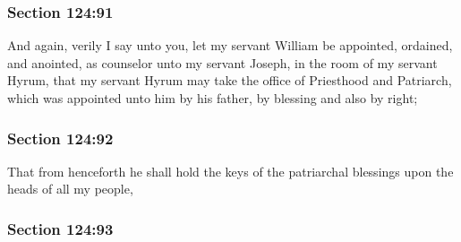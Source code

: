 
	\subsubsection{Section 124:91} %
		\label{DC124-91}

		And again, verily I say unto you, let my servant William be appointed, ordained, and anointed, as counselor unto my servant Joseph, in the room of my servant Hyrum, that my servant Hyrum may take the office of Priesthood and Patriarch, which was appointed unto him by his father, by blessing and also by right;


	\subsubsection{Section 124:92} %
		\label{DC124-92}

		That from henceforth he shall hold the keys of the patriarchal blessings upon the heads of all my people,


	\subsubsection{Section 124:93} %
		\label{DC124-93}

